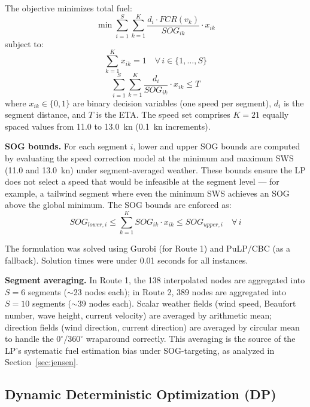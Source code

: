 \documentclass[review]{elsarticle}
\begin{document}
The objective minimizes total fuel:
\begin{equation}
    \min \sum_{i=1}^{S} \sum_{k=1}^{K} \frac{d_i \cdot FCR(v_k)}{SOG_{ik}} \cdot x_{ik}
    \label{eq:lp-obj}
\end{equation}
subject to:
\begin{equation}
    \sum_{k=1}^{K} x_{ik} = 1 \quad \forall\, i \in \{1, \ldots, S\}
    \label{eq:lp-assign}
\end{equation}
\begin{equation}
    \sum_{i=1}^{S} \sum_{k=1}^{K} \frac{d_i}{SOG_{ik}} \cdot x_{ik} \leq T
    \label{eq:lp-eta}
\end{equation}
where $x_{ik} \in \{0, 1\}$ are binary decision variables (one speed per segment), $d_i$ is the segment distance, and $T$ is the ETA. The speed set comprises $K = 21$ equally spaced values from 11.0 to 13.0~kn (0.1~kn increments).

\textbf{SOG bounds.} For each segment $i$, lower and upper SOG bounds are computed by evaluating the speed correction model at the minimum and maximum SWS (11.0 and 13.0~kn) under segment-averaged weather. These bounds ensure the LP does not select a speed that would be infeasible at the segment level --- for example, a tailwind segment where even the minimum SWS achieves an SOG above the global minimum. The SOG bounds are enforced as:
\begin{equation}
    SOG_{lower,i} \leq \sum_{k=1}^{K} SOG_{ik} \cdot x_{ik} \leq SOG_{upper,i} \quad \forall\, i
    \label{eq:sog-bounds}
\end{equation}

The formulation was solved using Gurobi (for Route 1) and PuLP/CBC (as a fallback). Solution times were under 0.01 seconds for all instances.

\textbf{Segment averaging.} In Route 1, the 138 interpolated nodes are aggregated into $S = 6$ segments ($\sim$23 nodes each); in Route 2, 389 nodes are aggregated into $S = 10$ segments ($\sim$39 nodes each). Scalar weather fields (wind speed, Beaufort number, wave height, current velocity) are averaged by arithmetic mean; direction fields (wind direction, current direction) are averaged by circular mean to handle the $0^\circ/360^\circ$ wraparound correctly. This averaging is the source of the LP's systematic fuel estimation bias under SOG-targeting, as analyzed in Section~\ref{sec:jensen}.

\subsection{Dynamic Deterministic Optimization (DP)}
\label{sec:dp}
\end{document}
